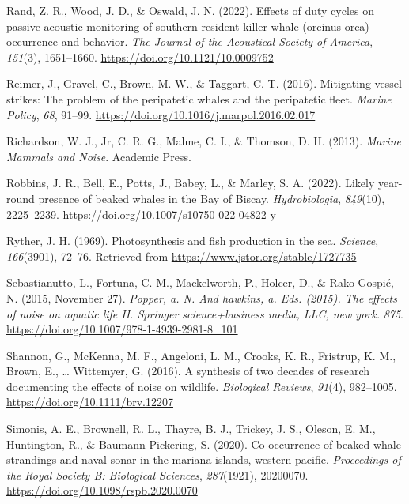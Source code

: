\documentclass[
]{article}
\newlength{\cslhangindent}
\newlength{\cslentryspacingunit} %
\newenvironment{CSLReferences}[2] %
 {%
  \setlength{\parindent}{0pt}
  \ifodd #1
  \let\oldpar\par
  \def\par{\hangindent=\cslhangindent\oldpar}
  \fi
  \setlength{\parskip}{#2\cslentryspacingunit}
 }%
 {}
\begin{document}
\begin{CSLReferences}{1}{0}
\leavevmode{}%
Rand, Z. R., Wood, J. D., \& Oswald, J. N. (2022). Effects of duty
cycles on passive acoustic monitoring of southern resident killer whale
(orcinus orca) occurrence and behavior. \emph{The Journal of the
Acoustical Society of America}, \emph{151}(3), 1651--1660.
\url{https://doi.org/10.1121/10.0009752}

\leavevmode{}%
Reimer, J., Gravel, C., Brown, M. W., \& Taggart, C. T. (2016).
Mitigating vessel strikes: The problem of the peripatetic whales and the
peripatetic fleet. \emph{Marine Policy}, \emph{68}, 91--99.
\url{https://doi.org/10.1016/j.marpol.2016.02.017}

\leavevmode{}%
Richardson, W. J., Jr, C. R. G., Malme, C. I., \& Thomson, D. H. (2013).
\emph{Marine Mammals and Noise}. Academic Press.

\leavevmode{}%
Robbins, J. R., Bell, E., Potts, J., Babey, L., \& Marley, S. A. (2022).
Likely year-round presence of beaked whales in the Bay of Biscay.
\emph{Hydrobiologia}, \emph{849}(10), 2225--2239.
\url{https://doi.org/10.1007/s10750-022-04822-y}

\leavevmode{}%
Ryther, J. H. (1969). Photosynthesis and fish production in the sea.
\emph{Science}, \emph{166}(3901), 72--76. Retrieved from
\url{https://www.jstor.org/stable/1727735}

\leavevmode{}%
Sebastianutto, L., Fortuna, C. M., Mackelworth, P., Holcer, D., \& Rako
Gospić, N. (2015, November 27). \emph{Popper, a. N. And hawkins, a. Eds.
(2015). The effects of noise on aquatic life II. Springer
science+business media, LLC, new york.} \emph{875}.
\url{https://doi.org/10.1007/978-1-4939-2981-8_101}

\leavevmode{}%
Shannon, G., McKenna, M. F., Angeloni, L. M., Crooks, K. R., Fristrup,
K. M., Brown, E., \ldots{} Wittemyer, G. (2016). A synthesis of two
decades of research documenting the effects of noise on wildlife.
\emph{Biological Reviews}, \emph{91}(4), 982--1005.
\url{https://doi.org/10.1111/brv.12207}

\leavevmode{}%
Simonis, A. E., Brownell, R. L., Thayre, B. J., Trickey, J. S., Oleson,
E. M., Huntington, R., \& Baumann-Pickering, S. (2020). Co-occurrence of
beaked whale strandings and naval sonar in the mariana islands, western
pacific. \emph{Proceedings of the Royal Society B: Biological Sciences},
\emph{287}(1921), 20200070. \url{https://doi.org/10.1098/rspb.2020.0070}


\end{CSLReferences}
\end{document}
